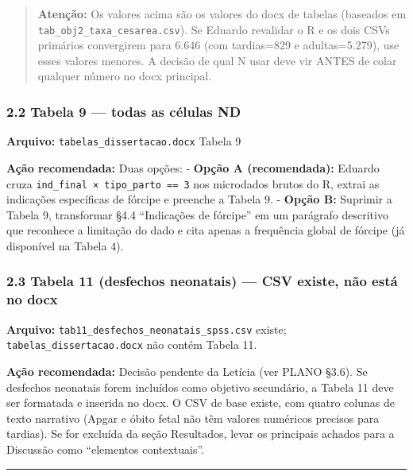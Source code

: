 \documentclass[
]{article}
\begin{document}
\begin{quote}
\textbf{Atenção:} Os valores acima são os valores do docx de tabelas
(baseados em \texttt{tab\_obj2\_taxa\_cesarea.csv}). Se Eduardo
revalidar o R e os dois CSVs primários convergirem para 6.646 (com
tardias=829 e adultas=5.279), use esses valores menores. A decisão de
qual N usar deve vir ANTES de colar qualquer número no docx principal.
\end{quote}

\hypertarget{tabela-9-todas-as-cuxe9lulas-nd}{%
\subsubsection{2.2 Tabela 9 --- todas as células
ND}\label{tabela-9-todas-as-cuxe9lulas-nd}}

\textbf{Arquivo:} \texttt{tabelas\_dissertacao.docx} Tabela 9

\textbf{Ação recomendada:} Duas opções: - \textbf{Opção A
(recomendada):} Eduardo cruza \texttt{ind\_final\ ×\ tipo\_parto\ ==\ 3}
nos microdados brutos do R, extrai as indicações específicas de fórcipe
e preenche a Tabela 9. - \textbf{Opção B:} Suprimir a Tabela 9,
transformar §4.4 ``Indicações de fórcipe'' em um parágrafo descritivo
que reconhece a limitação do dado e cita apenas a frequência global de
fórcipe (já disponível na Tabela 4).

\hypertarget{tabela-11-desfechos-neonatais-csv-existe-nuxe3o-estuxe1-no-docx}{%
\subsubsection{2.3 Tabela 11 (desfechos neonatais) --- CSV existe, não
está no
docx}\label{tabela-11-desfechos-neonatais-csv-existe-nuxe3o-estuxe1-no-docx}}

\textbf{Arquivo:} \texttt{tab11\_desfechos\_neonatais\_spss.csv} existe;
\texttt{tabelas\_dissertacao.docx} não contém Tabela 11.

\textbf{Ação recomendada:} Decisão pendente da Letícia (ver PLANO §3.6).
Se desfechos neonatais forem incluídos como objetivo secundário, a
Tabela 11 deve ser formatada e inserida no docx. O CSV de base existe,
com quatro colunas de texto narrativo (Apgar e óbito fetal não têm
valores numéricos precisos para tardias). Se for excluída da seção
Resultados, levar os principais achados para a Discussão como
``elementos contextuais''.

\begin{center}\rule{0.5\linewidth}{0.5pt}\end{center}
\end{document}
